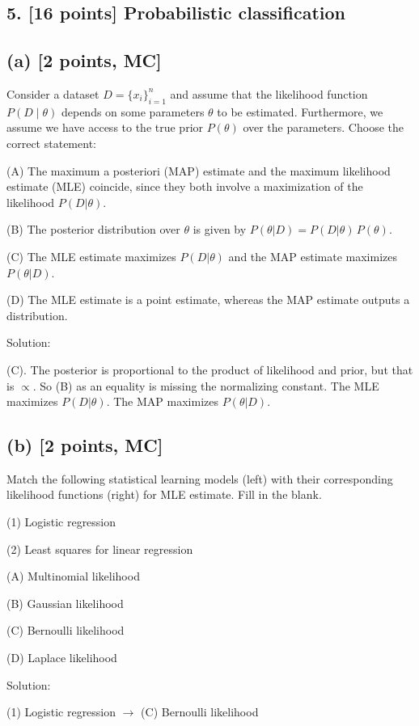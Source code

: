 \documentclass[twocolumn]{article}
\begin{document}
\begin{spacing}{1}
\bigskip

\section{5. [16 points] Probabilistic classification}

\subsection*{(a) [2 points, MC]}
Consider a dataset \(D=\{x_i\}_{i=1}^n\) and assume that the likelihood function \(P(D\mid \theta)\) depends on some parameters \(\theta\) to be estimated. Furthermore, we assume we have access to the true prior \(P(\theta)\) over the parameters. Choose the correct statement:

(A) The maximum a posteriori (MAP) estimate and the maximum likelihood estimate (MLE) coincide, since they both involve a maximization of the likelihood \(P(D|\theta)\).

(B) The posterior distribution over \(\theta\) is given by \(P(\theta|D) = P(D|\theta)\,P(\theta)\).

(C) The MLE estimate maximizes \(P(D|\theta)\) and the MAP estimate maximizes \(P(\theta|D)\).

(D) The MLE estimate is a point estimate, whereas the MAP estimate outputs a distribution.

Solution:

(C). The posterior is proportional to the product of likelihood and prior, but that is \(\propto\). So (B) as an equality is missing the normalizing constant. The MLE maximizes \(P(D|\theta)\). The MAP maximizes \(P(\theta|D)\).

\subsection*{(b) [2 points, MC]}
Match the following statistical learning models (left) with their corresponding likelihood functions (right) for MLE estimate. Fill in the blank.

(1) Logistic regression

(2) Least squares for linear regression

(A) Multinomial likelihood

(B) Gaussian likelihood

(C) Bernoulli likelihood

(D) Laplace likelihood

Solution:

(1) Logistic regression \(\rightarrow\) (C) Bernoulli likelihood


\end{spacing}
\end{document}
